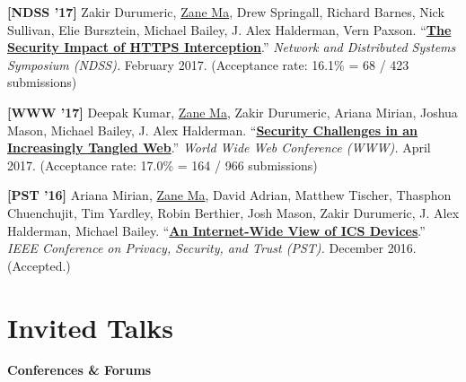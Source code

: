 \documentclass[10pt,singlecolumn]{article} %
\begin{document}
\begin{etaremune}

\item \textbf{[NDSS '17]}
Zakir Durumeric, \underline{Zane Ma}, Drew Springall, Richard Barnes, Nick Sullivan, Elie Bursztein, Michael Bailey, J. Alex Halderman, Vern Paxson.
``\textbf{\href{https://zanema.com/papers/ndss17_interception.pdf}{The Security Impact of HTTPS Interception}}.''
\emph{Network and Distributed Systems Symposium (NDSS).} February 2017.
(Acceptance rate: 16.1\% = 68 / 423 submissions)
\vspace{6pt}


\item \textbf{[WWW '17]}
Deepak Kumar, \underline{Zane Ma}, Zakir Durumeric, Ariana Mirian, Joshua Mason, Michael Bailey, J. Alex Halderman.
``\textbf{\href{https://zanema.com/papers/www17_tangled.pdf}{Security Challenges in an Increasingly Tangled Web}}.''
\emph{World Wide Web Conference (WWW).} April 2017.
(Acceptance rate: 17.0\% = 164 / 966 submissions)
\vspace{6pt}


\item \textbf{[PST '16]}
Ariana Mirian, \underline{Zane Ma}, David Adrian, Matthew Tischer, Thasphon Chuenchujit, Tim Yardley, Robin Berthier, Josh Mason, Zakir Durumeric, J. Alex Halderman, Michael Bailey.
``\textbf{\href{https://zanema.com/papers/pst16_ics.pdf}{An Internet-Wide View of ICS Devices}}.''
\emph{IEEE Conference on Privacy, Security, and Trust (PST).} December 2016. (Accepted.)
\vspace{6pt}

\end{etaremune}


\section{Invited Talks} 

\textbf{Conferences \& Forums}\\
\end{document}

